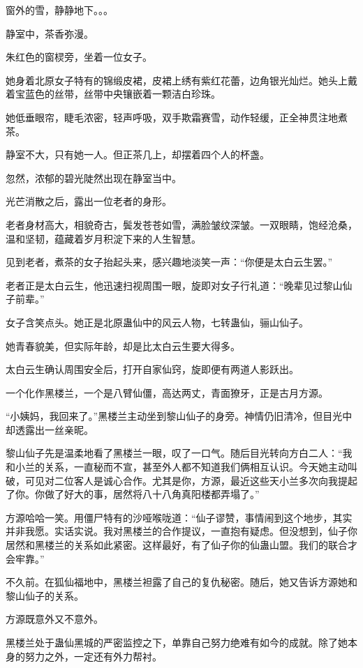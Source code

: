 
\begin{this_body}

窗外的雪，静静地下。。。

静室中，茶香弥漫。

朱红色的窗棂旁，坐着一位女子。

她身着北原女子特有的锦缎皮裙，皮裙上绣有紫红花蕾，边角银光灿烂。她头上戴着宝蓝色的丝带，丝带中央镶嵌着一颗洁白珍珠。

她低垂眼帘，睫毛浓密，轻声呼吸，双手欺霜赛雪，动作轻缓，正全神贯注地煮茶。

静室不大，只有她一人。但正茶几上，却摆着四个人的杯盏。

忽然，浓郁的碧光陡然出现在静室当中。

光芒消散之后，露出一位老者的身形。

老者身材高大，相貌奇古，鬓发苍苍如雪，满脸皱纹深皱。一双眼睛，饱经沧桑，温和坚韧，蕴藏着岁月积淀下来的人生智慧。

见到老者，煮茶的女子抬起头来，感兴趣地淡笑一声：“你便是太白云生罢。”

老者正是太白云生，他迅速扫视周围一眼，旋即对女子行礼道：“晚辈见过黎山仙子前辈。”

女子含笑点头。她正是北原蛊仙中的风云人物，七转蛊仙，骊山仙子。

她青春貌美，但实际年龄，却是比太白云生要大得多。

太白云生确认周围安全后，打开自家仙窍，旋即便有两道人影跃出。

一个化作黑楼兰，一个是八臂仙僵，高达两丈，青面獠牙，正是古月方源。

“小姨妈，我回来了。”黑楼兰主动坐到黎山仙子的身旁。神情仍旧清冷，但目光中却透露出一丝亲昵。

黎山仙子先是温柔地看了黑楼兰一眼，叹了一口气。随后目光转向方白二人：“我和小兰的关系，一直秘而不宣，甚至外人都不知道我们俩相互认识。今天她主动叫破，可见对二位客人是诚心合作。尤其是你，方源，最近这些天小兰多次向我提起了你。你做了好大的事，居然将八十八角真阳楼都弄塌了。”

方源哈哈一笑。用僵尸特有的沙哑喉咙道：“仙子谬赞，事情闹到这个地步，其实并非我愿。实话实说。我对黑楼兰的合作提议，一直抱有疑虑。但没想到，仙子你居然和黑楼兰的关系如此紧密。这样最好，有了仙子你的仙蛊山盟。我们的联合才会牢靠。”

不久前。在狐仙福地中，黑楼兰袒露了自己的复仇秘密。随后，她又告诉方源她和黎山仙子的关系。

方源既意外又不意外。

黑楼兰处于蛊仙黑城的严密监控之下，单靠自己努力绝难有如今的成就。除了她本身的努力之外，一定还有外力帮衬。


\end{this_body}
